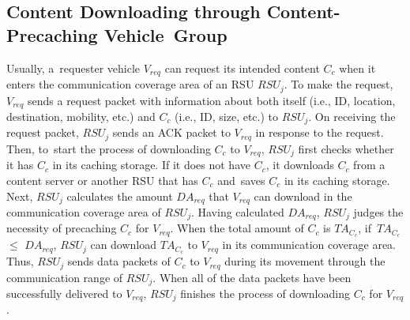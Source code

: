 \documentclass[sensors,aricle,accept,pdftex,moreauthors]{Definitions/mdpi}
\begin{document}
\subsection{Content Downloading through Content-Precaching Vehicle~Group} \label{sec4.4}
Usually, a~requester vehicle $V_{req}$ can request its intended content $C_{c}$ when it enters the communication coverage area of an RSU $RSU_{j}$.
To make the request, $V_{req}$ sends a request packet with information about both itself (i.e., ID, location, destination, mobility, etc.) and $C_{c}$ (i.e., ID,  size, etc.) to $RSU_{j}$.
On receiving the request packet, $RSU_{j}$ sends an ACK packet to $V_{req}$ in response to the request. 
Then, to~start the process of downloading $C_{c}$ to $V_{req}$, $RSU_{j}$ first checks whether it has $C_{c}$ in its caching storage.
If it does not have $C_{c}$, it downloads $C_{c}$ from a content server or another RSU that has $C_{c}$ and~saves $C_{c}$ in its caching storage.
Next, $RSU_{j}$ calculates the amount $DA_{req}$ that $V_{req}$ can download in the communication coverage area of $RSU_{j}$.
Having calculated $DA_{req}$, $RSU_{j}$ judges the necessity of precaching $C_{c}$ for $V_{req}$.  
When the total amount of $C_{c}$ is $TA_{C_{c}}$, if~$TA_{C_{c}}$ $\leq$ $DA_{req}$, $RSU_{j}$ can download $TA_{C_{c}}$ to $V_{req}$ in its communication coverage area.
Thus, $RSU_{j}$ sends data packets of $C_{c}$ to $V_{req}$ during its movement through the communication range of $RSU_{j}$.
When all of the data packets have been successfully delivered to $V_{req}$, $RSU_{j}$ finishes the process of downloading $C_{c}$ for $V_{req}$.
\end{document}
